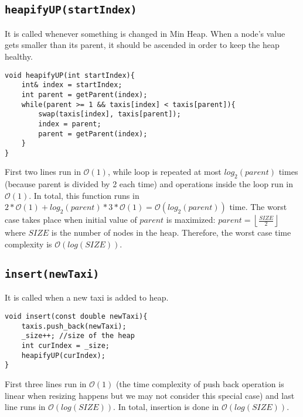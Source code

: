 \documentclass[12pt, a4paper]{article}
\begin{document}
\subsection{\texttt{heapifyUP(startIndex)}}
\noindent It is called whenever something is changed in Min Heap. When a node's value gets smaller than its parent, it should be ascended in order to keep the heap healthy.
\begin{lstlisting}
void heapifyUP(int startIndex){
    int& index = startIndex;
    int parent = getParent(index);
    while(parent >= 1 && taxis[index] < taxis[parent]){
        swap(taxis[index], taxis[parent]);
        index = parent;
        parent = getParent(index);
    }
}
\end{lstlisting}
First two lines run in $\mathcal{O}(1)$, while loop is repeated at most $log_2(parent)$ times (because parent is divided by 2 each time) and operations inside the loop run in $\mathcal{O}(1)$. In total, this function runs in $2*\mathcal{O}(1) + log_2(parent) * 3 * \mathcal{O}(1) = \mathcal{O}(log_2(parent))$ time. The worst case takes place when initial value of $parent$ is maximized: $parent = \left \lfloor \frac{SIZE}{2} \right \rfloor$ where $SIZE$ is the number of nodes in the heap. Therefore, the worst case time complexity is $\mathcal{O}(log(SIZE))$.
\subsection{\texttt{insert(newTaxi)}}
It is called when a new taxi is added to heap.
\begin{lstlisting}
void insert(const double newTaxi){
    taxis.push_back(newTaxi);
    _size++; //size of the heap
    int curIndex = _size;
    heapifyUP(curIndex);
}
\end{lstlisting}
First three lines run in $\mathcal{O}(1)$ (the time complexity of push back operation is linear when resizing happens but we may not consider this special case) and last line runs in $\mathcal{O}(log(SIZE))$. In total, insertion is done in $\mathcal{O}(log(SIZE))$.
\newpage
\end{document}

